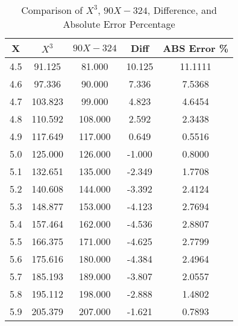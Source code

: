 ﻿%
\begin{table}[h!]
    \centering
    \caption{Comparison of $X^3$, $90X-324$, Difference, and Absolute Error Percentage}
    \begin{tabular}{|c|c|c|c|c|}
        \hline
        \textbf{X} & \textbf{$X^3$} & \textbf{$90X-324$} & \textbf{Diff} & \textbf{ABS Error \%} \\ \hline
        4.5        & 91.125         & 81.000             & 10.125        & 11.1111               \\ \hline
        4.6        & 97.336         & 90.000             & 7.336         & 7.5368                \\ \hline
        4.7        & 103.823        & 99.000             & 4.823         & 4.6454                \\ \hline
        4.8        & 110.592        & 108.000            & 2.592         & 2.3438                \\ \hline
        4.9        & 117.649        & 117.000            & 0.649         & 0.5516                \\ \hline
        5.0        & 125.000        & 126.000            & -1.000        & 0.8000                \\ \hline
        5.1        & 132.651        & 135.000            & -2.349        & 1.7708                \\ \hline
        5.2        & 140.608        & 144.000            & -3.392        & 2.4124                \\ \hline
        5.3        & 148.877        & 153.000            & -4.123        & 2.7694                \\ \hline
        5.4        & 157.464        & 162.000            & -4.536        & 2.8807                \\ \hline
        5.5        & 166.375        & 171.000            & -4.625        & 2.7799                \\ \hline
        5.6        & 175.616        & 180.000            & -4.384        & 2.4964                \\ \hline
        5.7        & 185.193        & 189.000            & -3.807        & 2.0557                \\ \hline
        5.8        & 195.112        & 198.000            & -2.888        & 1.4802                \\ \hline
        5.9        & 205.379        & 207.000            & -1.621        & 0.7893                \\ \hline

\end{tabular}
\end{table}
